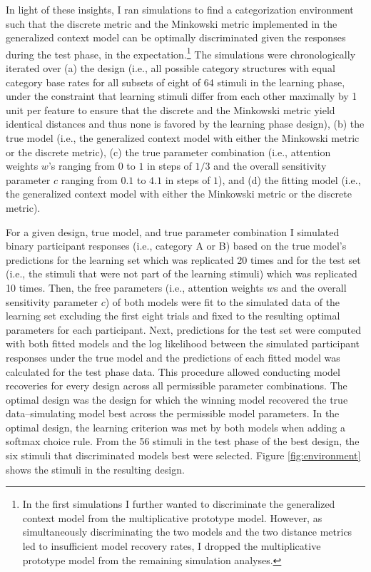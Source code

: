 \documentclass[a4paper,man,natbib]{apa6}
\begin{document}
In light of these insights, I ran simulations to find a categorization environment such that the discrete metric and the Minkowski metric implemented in the generalized context model can be optimally discriminated given the responses during the test phase, in the expectation.\footnote{In the first simulations I further wanted to discriminate the generalized context model from the multiplicative prototype model. However, as simultaneously discriminating the two models and the two distance metrics led to insufficient model recovery rates, I dropped the multiplicative prototype model from the remaining simulation analyses.} The simulations were chronologically iterated over (a) the design (i.e., all possible category structures with equal category base rates for all subsets of eight of 64 stimuli in the learning phase, under the constraint that learning stimuli differ from each other maximally by 1 unit per feature to ensure that the discrete and the Minkowski metric yield identical distances and thus none is favored by the learning phase design), (b) the true model (i.e., the generalized context model with either the Minkowski metric or the discrete metric), (c) the true parameter combination (i.e., attention weights $w$'s ranging from $0$ to $1$ in steps of $1/3$ and the overall sensitivity parameter $c$ ranging from $0.1$ to $4.1$ in steps of $1$), and (d) the fitting model (i.e., the generalized context model with either the Minkowski metric or the discrete metric).

For a given design, true model, and true parameter combination I simulated binary participant responses (i.e., category A or B) based on the true model's predictions for the learning set which was replicated 20 times and for the test set (i.e., the stimuli that were not part of the learning stimuli) which was replicated 10 times. Then, the free parameters (i.e., attention weights $w$s and the overall sensitivity parameter $c$) of both models were fit to the simulated data of the learning set excluding the first eight trials and fixed to the resulting optimal parameters for each participant. Next, predictions for the test set were computed with both fitted models and the log likelihood between the simulated participant responses under the true model and the predictions of each fitted model was calculated for the test phase data. This procedure allowed conducting model recoveries for every design across all permissible parameter combinations. The optimal design was the design for which the winning model recovered the true data--simulating model best across the permissible model parameters. In the optimal design, the learning criterion was met by both models when adding a softmax choice rule. From the 56 stimuli in the test phase of the best design, the six stimuli that discriminated models best were selected. Figure \ref{fig:environment} shows the stimuli in the resulting design.
\end{document}
